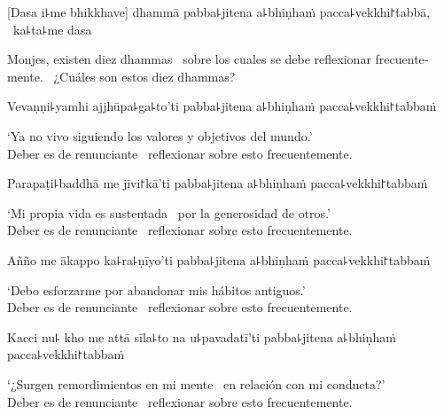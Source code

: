 
\begin{leader}
\end{leader}

[Dasa i꜕me bhikkhave] dhammā pabba꜕jitena a꜕bhiṇhaṁ pacca꜕vekkhi꜓tabbā, \pause\ ka꜕ta꜕me dasa

\begin{english}
  Monjes, existen diez dhammas \pause\ sobre los cuales se debe reflexionar frecuentemente. \pause\ ¿Cuáles son estos diez dhammas?
\end{english}

Vevaṇṇi꜕yamhi ajjhūpa꜕ga꜕to'ti pabba꜕jitena a꜕bhiṇhaṁ pacca꜕vekkhi꜓tabbaṁ

\begin{english}
  ‘Ya no vivo siguiendo los valores y objetivos del mundo.’ \pause\\
  Deber es de renunciante \pause\ reflexionar sobre esto frecuentemente.
\end{english}

Parapaṭi꜕baddhā me jīvi꜓kā'ti pabba꜕jitena a꜕bhiṇhaṁ pacca꜕vekkhi꜓tabbaṁ

\begin{english}
  ‘Mi propia vida es sustentada \pause\ por la generosidad de otros.’ \pause\\
  Deber es de renunciante \pause\ reflexionar sobre esto frecuentemente.
\end{english}

Añño me ākappo ka꜕ra꜕ṇīyo'ti pabba꜕jitena a꜕bhiṇhaṁ pacca꜕vekkhi꜓tabbaṁ

\begin{english}
  ‘Debo esforzarme por abandonar mis hábitos antiguos.’ \pause\\
  Deber es de renunciante \pause\ reflexionar sobre esto frecuentemente.
\end{english}

\clearpage

Kacci nu꜕ kho me attā sīla꜕to na u꜕pavadatī'ti pabba꜕jitena a꜕bhiṇhaṁ pacca꜕vekkhi꜓tabbaṁ

\begin{english}
  ‘¿Surgen remordimientos en mi mente \pause\ en relación con mi conducta?’ \pause\\
  Deber es de renunciante \pause\ reflexionar sobre esto frecuentemente.
\end{english}

